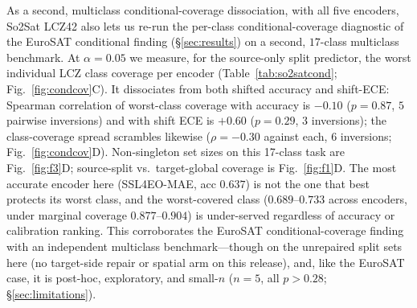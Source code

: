 \documentclass[preprint,11pt,authoryear]{elsarticle}
\begin{document}
As a second, multiclass conditional-coverage dissociation, with all five encoders, So2Sat LCZ42
also lets us re-run the per-class conditional-coverage diagnostic of the EuroSAT conditional finding
(\S\ref{sec:results}) on a second, $17$-class multiclass benchmark. At $\alpha{=}0.05$ we measure, for the
source-only split predictor, the worst individual LCZ class coverage per encoder (Table~\ref{tab:so2satcond};
Fig.~\ref{fig:condcov}C).
It dissociates from both shifted accuracy and shift-ECE:
Spearman correlation of worst-class coverage with accuracy is $-0.10$ ($p{=}0.87$, $5$ pairwise inversions)
and with shift ECE is $+0.60$ ($p{=}0.29$, $3$ inversions);
the class-coverage spread scrambles likewise ($\rho=-0.30$ against each, $6$ inversions; Fig.~\ref{fig:condcov}D).
Non-singleton set sizes on this 17-class task are Fig.~\ref{fig:f3}D; source-split vs.\ target-global coverage is Fig.~\ref{fig:f1}D. The most accurate
encoder here (SSL4EO-MAE, acc $0.637$) is not the one that best protects its worst class, and the
worst-covered class ($0.689$--$0.733$ across encoders, under marginal coverage $0.877$--$0.904$) is
under-served regardless of accuracy or calibration ranking. This corroborates the EuroSAT
conditional-coverage finding with an independent multiclass benchmark---though on the unrepaired
split sets here (no target-side repair or spatial arm on this release), and, like the EuroSAT case, it is
post-hoc, exploratory, and small-$n$ ($n{=}5$, all $p>0.28$; \S\ref{sec:limitations}).

\begin{table}[htbp]\centering\small
\caption{Per-class conditional coverage on GEO-Bench So2Sat LCZ42 ($17$ LCZ classes; source-only
split-conformal, $\alpha{=}0.05$; 5 seeds). The worst individual-class coverage dissociates from shifted
accuracy and shift-ECE (Spearman $-0.10$ vs.\ accuracy, $+0.60$ vs.\ ECE; $5/3$ pairwise
inversions), a second multiclass instance of the EuroSAT conditional-coverage collapse.}\label{tab:so2satcond}
\end{table}
\end{document}
